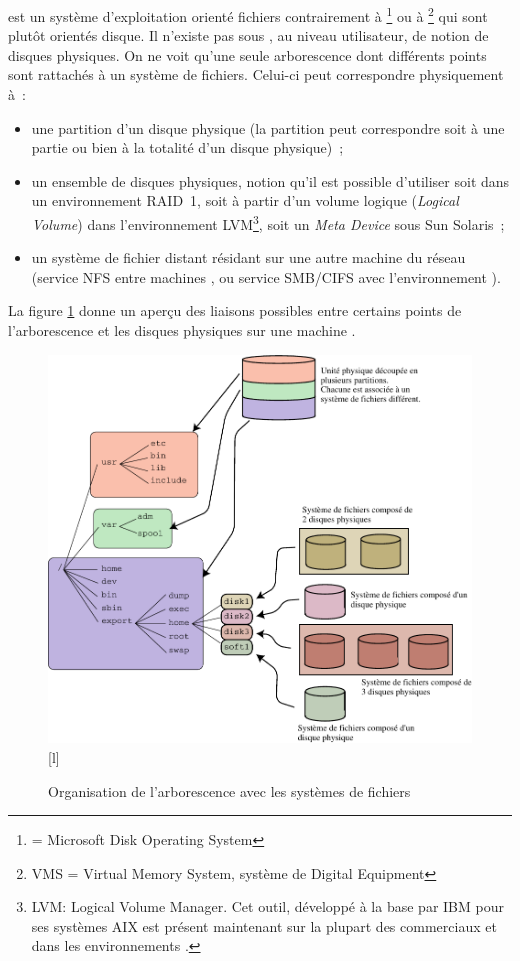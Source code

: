{\Unix} est un syst{\`e}me d'exploitation orient{\'e} fichiers contrairement
{\`a} {\DOS}\footnote{{\DOS}= Microsoft Disk Operating System} ou {\`a}
{\OpenVMS}\footnote{VMS = Virtual Memory System, syst{\`e}me de Digital Equipment}
qui sont plut{\^o}t orient{\'e}s disque. Il n'existe pas sous {\Unix}, au
niveau utilisateur, de notion de disques physiques. On ne voit qu'une
seule arborescence dont diff{\'e}rents points sont rattach{\'e}s {\`a} un syst{\`e}me de
fichiers. Celui-ci peut correspondre physiquement {\`a}~:
\begin{itemize}
	\item une partition d'un disque physique (la partition peut correspondre
	      soit {\`a} une partie ou bien {\`a} la totalit{\'e} d'un disque physique)~;
	\item un ensemble de disques physiques, notion qu'il est possible d'utiliser soit dans
un environnement RAID~1, soit {\`a} partir d'un volume logique ({\sl Logical Volume})
dans l'environnement LVM\footnote{LVM: Logical Volume Manager. Cet outil, d{\'e}velopp{\'e}
{\`a} la base par IBM pour ses syst{\`e}mes AIX est pr{\'e}sent maintenant sur la plupart
des {\Unix} commerciaux et dans les environnements {\Linux}.}, soit un
{\sl Meta Device} sous Sun Solaris~;
	\item un syst{\`e}me de fichier distant r{\'e}sidant sur une autre machine du r{\'e}seau
	      (service NFS entre machines {\Unix}, ou service SMB/CIFS avec l'environnement {\Windows}).
\end{itemize}

La figure \ref{fig-bcpts-orgdisk} donne un aper\c{c}u des liaisons possibles
entre certains points de l'arborescence et les disques physiques sur une
machine {\Unix}.

\begin{figure}[hbtp]
\centering
	\includegraphics{./_Images/base-concepts/orgdisk}[l]
	\caption{\label{fig-bcpts-orgdisk}Organisation de l'arborescence {\Unix} avec les syst{\`e}mes de fichiers}
\end{figure}

